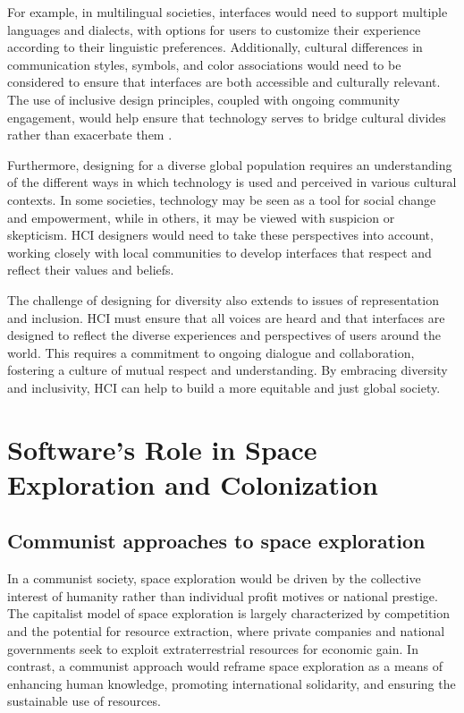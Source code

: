 For example, in multilingual societies, interfaces would need to support multiple languages and dialects, with options for users to customize their experience according to their linguistic preferences. Additionally, cultural differences in communication styles, symbols, and color associations would need to be considered to ensure that interfaces are both accessible and culturally relevant. The use of inclusive design principles, coupled with ongoing community engagement, would help ensure that technology serves to bridge cultural divides rather than exacerbate them \cite[pp.~45-47]{gramsci1971}.

Furthermore, designing for a diverse global population requires an understanding of the different ways in which technology is used and perceived in various cultural contexts. In some societies, technology may be seen as a tool for social change and empowerment, while in others, it may be viewed with suspicion or skepticism. HCI designers would need to take these perspectives into account, working closely with local communities to develop interfaces that respect and reflect their values and beliefs.

The challenge of designing for diversity also extends to issues of representation and inclusion. HCI must ensure that all voices are heard and that interfaces are designed to reflect the diverse experiences and perspectives of users around the world. This requires a commitment to ongoing dialogue and collaboration, fostering a culture of mutual respect and understanding. By embracing diversity and inclusivity, HCI can help to build a more equitable and just global society.

\section{Software's Role in Space Exploration and Colonization}

\subsection{Communist approaches to space exploration}

In a communist society, space exploration would be driven by the collective interest of humanity rather than individual profit motives or national prestige. The capitalist model of space exploration is largely characterized by competition and the potential for resource extraction, where private companies and national governments seek to exploit extraterrestrial resources for economic gain. In contrast, a communist approach would reframe space exploration as a means of enhancing human knowledge, promoting international solidarity, and ensuring the sustainable use of resources.

